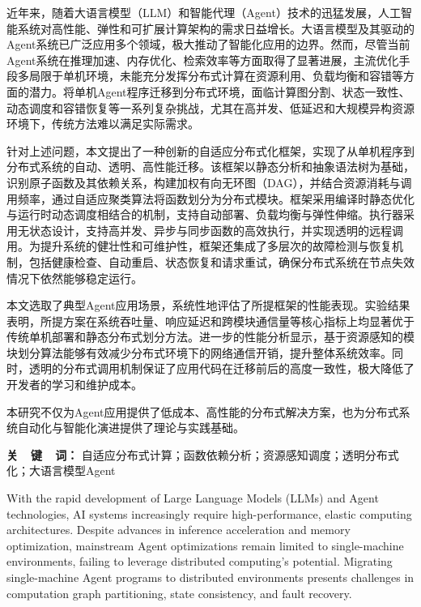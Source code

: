 \AbstractTitleCN

近年来，随着大语言模型（LLM）和智能代理（Agent）技术的迅猛发展，人工智能系统对高性能、弹性和可扩展计算架构的需求日益增长。大语言模型及其驱动的Agent系统已广泛应用多个领域，极大推动了智能化应用的边界。然而，尽管当前Agent系统在推理加速、内存优化、检索效率等方面取得了显著进展，主流优化手段多局限于单机环境，未能充分发挥分布式计算在资源利用、负载均衡和容错等方面的潜力。将单机Agent程序迁移到分布式环境，面临计算图分割、状态一致性、动态调度和容错恢复等一系列复杂挑战，尤其在高并发、低延迟和大规模异构资源环境下，传统方法难以满足实际需求。

针对上述问题，本文提出了一种创新的自适应分布式化框架，实现了从单机程序到分布式系统的自动、透明、高性能迁移。该框架以静态分析和抽象语法树为基础，识别原子函数及其依赖关系，构建加权有向无环图（DAG），并结合资源消耗与调用频率，通过自适应聚类算法将函数划分为分布式模块。框架采用编译时静态优化与运行时动态调度相结合的机制，支持自动部署、负载均衡与弹性伸缩。执行器采用无状态设计，支持高并发、异步与同步函数的高效执行，并实现透明的远程调用。为提升系统的健壮性和可维护性，框架还集成了多层次的故障检测与恢复机制，包括健康检查、自动重启、状态恢复和请求重试，确保分布式系统在节点失效情况下依然能够稳定运行。
  
本文选取了典型Agent应用场景，系统性地评估了所提框架的性能表现。实验结果表明，所提方案在系统吞吐量、响应延迟和跨模块通信量等核心指标上均显著优于传统单机部署和静态分布式划分方法。进一步的性能分析显示，基于资源感知的模块划分算法能够有效减少分布式环境下的网络通信开销，提升整体系统效率。同时，透明的分布式调用机制保证了应用代码在迁移前后的高度一致性，极大降低了开发者的学习和维护成本。
  
本研究不仅为Agent应用提供了低成本、高性能的分布式解决方案，也为分布式系统自动化与智能化演进提供了理论与实践基础。

\vspace{\baselineskip}
\noindent
\textbf{关\ \ 键\ \ 词：} 自适应分布式计算；函数依赖分析；资源感知调度；透明分布式化；大语言模型Agent

\AbstractTitleEN

\noindent
With the rapid development of Large Language Models (LLMs) and Agent technologies, AI systems increasingly require high-performance, elastic computing architectures. Despite advances in inference acceleration and memory optimization, mainstream Agent optimizations remain limited to single-machine environments, failing to leverage distributed computing's potential. Migrating single-machine Agent programs to distributed environments presents challenges in computation graph partitioning, state consistency, and fault recovery.
\vspace{\baselineskip}

